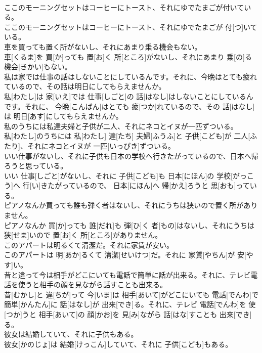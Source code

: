 \documentclass[8pt]{extreport}
\begin{document}
\begin{CJK}{UTF8}{min}
\\	ここのモーニングセットはコーヒーにトースト、それにゆでたまごが付いている。	
\\	ここのモーニングセットはコーヒーにトースト、それにゆでたまごが 付[つ]いている。
\\	車を買っても置く所がないし、それにあまり乗る機会もない。	
\\	車[くるま]を 買[か]っても 置[お]く 所[ところ]がないし、それにあまり 乗[の]る 機会[きかい]もない。
\\	私は家では仕事の話はしないことにしているんです。それに、今晩はとても疲れているので、その話は明日にしてもらえませんか。	
\\	私[わたし]は 家[いえ]では 仕事[しごと]の 話[はなし]はしないことにしているんです。それに、 今晩[こんばん]はとても 疲[つか]れているので、その 話[はなし]は 明日[あす]にしてもらえませんか。
\\	私のうちには私達夫婦と子供が二人、それにネコとイヌが一匹ずついる。	
\\	私[わたし]のうちには 私[わたし] 達[たち] 夫婦[ふうふ]と 子供[こども]が 二人[ふたり]、それにネコとイヌが 一匹[いっぴき]ずついる。
\\	いい仕事がないし、それに子供も日本の学校へ行きたがっているので、日本へ帰ろうと思っている。	
\\	いい 仕事[しごと]がないし、それに 子供[こども]も 日本[にほん]の 学校[がっこう]へ 行[い]きたがっているので、 日本[にほん]へ 帰[かえ]ろうと 思[おも]っている。
\\	ピアノなんか買っても誰も弾く者はないし、それにうちは狭いので置く所がありません。	
\\	ピアノなんか 買[か]っても 誰[だれ]も 弾[ひ]く 者[もの]はないし、それにうちは 狭[せま]いので 置[お]く 所[ところ]がありません。
\\	このアパートは明るくて清潔だ。それに家賃が安い。	
\\	このアパートは 明[あか]るくて 清潔[せいけつ]だ。それに 家賃[やちん]が 安[やす]い。
\\	昔と違って今は相手がどこにいても電話で簡単に話が出来る。それに、テレビ電話を使うと相手の顔を見ながら話すことも出来る。	
\\	昔[むかし]と 違[ちが]って 今[いま]は 相手[あいて]がどこにいても 電話[でんわ]で 簡単[かんたん]に 話[はなし]が 出来[でき]る。それに、テレビ 電話[でんわ]を 使[つか]うと 相手[あいて]の 顔[かお]を 見[み]ながら 話[はな]すことも 出来[でき]る。
\\	彼女は結婚していて、それに子供もある。	
\\	彼女[かのじょ]は 結婚[けっこん]していて、それに 子供[こども]もある。

\end{CJK}
\end{document}
